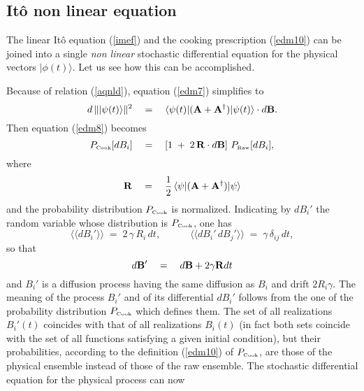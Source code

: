 \documentclass[12pt]{article}
\newcommand{\llangle}{\langle\!\langle}
\newcommand{\rrangle}{\rangle\!\rangle}
\begin{document}
\subsection{It\^o non linear equation} \label{sec62}

The linear It\^o equation (\ref{imef}) and the cooking
prescription (\ref{edm10}) can be joined into a single {\it non
linear} stochastic differential equation for the physical vectors
$|\phi(t)\rangle$. Let us see how this can be accomplished.

Because of relation (\ref{aqnld}), equation (\ref{edm7})
simplifies to
\begin{equation} \label{mdc}
d\,\| |\psi(t)\rangle\|^{2} \quad = \quad \langle\psi(t)|({\bf A}
+ {\bf A}^{\dagger})|\psi(t) \rangle\cdot d{\bf B}.
\end{equation}
Then equation (\ref{edm8}) becomes
\begin{equation}
P_{\makebox{\tiny Cook}}[dB_{i}] \quad = \quad \left[ 1\; + \;
2\,{\bf R}\cdot d{\bf B} \right]\, P_{\makebox{\tiny
Raw}}[dB_{i}],
\end{equation}
where
\begin{equation}
{\bf R}\quad = \quad \frac{1}{2}\, \langle\psi|({\bf A} + {\bf
A}^{\dagger})|\psi \rangle
\end{equation}
and the probability distribution $P_{\makebox{\tiny Cook}}$ is
normalized. Indicating by $dB_{i}'$ the random variable whose
distribution is $P_{\makebox{\tiny Cook}}$, one has
\begin{equation}
\llangle dB_{i}' \rrangle \; = \; 2\,\gamma\,R_{i}\,dt, \qquad
\quad \llangle dB_{i}'\, dB_{j}' \rrangle \; = \;
\gamma\,\delta_{ij}\,dt,
\end{equation}
so that
\begin{equation}
d{\bf B}' \quad = \quad d{\bf B} + 2\gamma {\bf R} dt
\end{equation}
and $B_{i}'$ is a diffusion process having the same diffusion as
$B_{i}$ and drift  $2 R_{i} \gamma$. The meaning of the process
$B_{i}'$ and of its differential $d B_{i}'$ follows from the one
of the probability distribution $P_{\makebox{\tiny Cook}}$ which
defines them. The set of all realizations $B_{i}'(t)$ coincides
with that of all realizations $B_{i}(t)$ (in fact both sets
coincide with the set of all functions satisfying a given initial
condition), but their probabilities, according to the definition
(\ref{edm10}) of $P_{\makebox{\tiny Cook}}$, are those of the
physical ensemble instead of those of the raw ensemble. The
stochastic differential equation for the physical process can now
\end{document}
